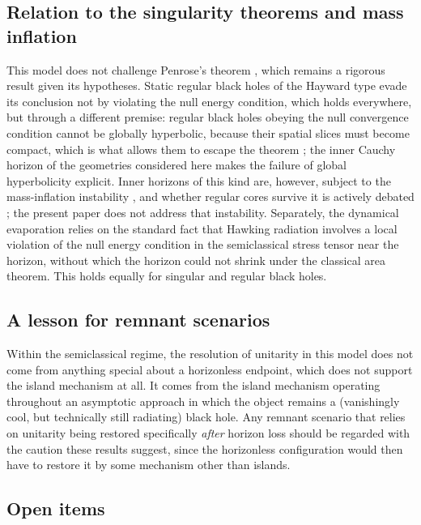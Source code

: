 \documentclass[11pt]{article}
\begin{document}
\subsection{Relation to the singularity theorems and mass inflation}

This model does not challenge Penrose's theorem \citep{Penrose1965}, which remains a rigorous result given its hypotheses. Static regular black holes of the Hayward type evade its conclusion not by violating the null energy condition, which holds everywhere, but through a different premise: regular black holes obeying the null convergence condition cannot be globally hyperbolic, because their spatial slices must become compact, which is what allows them to escape the theorem \citep{Borde1997}; the inner Cauchy horizon of the geometries considered here makes the failure of global hyperbolicity explicit. Inner horizons of this kind are, however, subject to the mass-inflation instability \citep{PoissonIsrael1990}, and whether regular cores survive it is actively debated \citep{CarballoRubio2021,Bonanno2021}; the present paper does not address that instability. Separately, the dynamical evaporation relies on the standard fact that Hawking radiation involves a local violation of the null energy condition in the semiclassical stress tensor near the horizon, without which the horizon could not shrink under the classical area theorem. This holds equally for singular and regular black holes.

\subsection{A lesson for remnant scenarios}

Within the semiclassical regime, the resolution of unitarity in this model does not come from anything special about a horizonless endpoint, which does not support the island mechanism at all. It comes from the island mechanism operating throughout an asymptotic approach in which the object remains a (vanishingly cool, but technically still radiating) black hole. Any remnant scenario that relies on unitarity being restored specifically \emph{after} horizon loss should be regarded with the caution these results suggest, since the horizonless configuration would then have to restore it by some mechanism other than islands.

\subsection{Open items}
\end{document}
